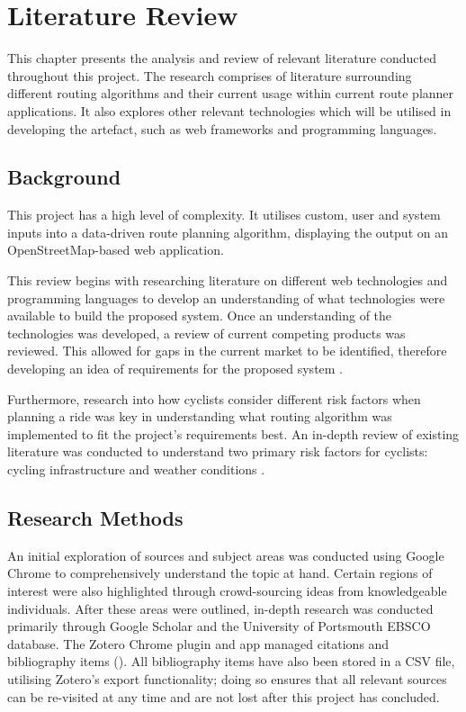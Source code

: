 \chapter{Literature Review} 
\label{chap:litrev}

This chapter presents the analysis and review of relevant literature conducted throughout this project. The research comprises of literature surrounding different routing algorithms and their current usage within current route planner applications. It also explores other relevant technologies which will be utilised in developing the artefact, such as web frameworks and programming languages.

\section{Background}
\label{litrev:background}
This project has a high level of complexity. It utilises custom, user and system inputs into a data-driven route planning algorithm, displaying the output on an OpenStreetMap-based web application. 

This review begins with researching literature on different web technologies and programming languages to develop an understanding of what technologies were available to build the proposed system. Once an understanding of the technologies was developed, a review of current competing products was reviewed. This allowed for gaps in the current market to be identified, therefore developing an idea of requirements for the proposed system . 

Furthermore, research into how cyclists consider different risk factors when planning a ride was key in understanding what routing algorithm was implemented to fit the project's requirements best. An in-depth review of existing literature was conducted to understand two primary risk factors for cyclists: cycling infrastructure  and weather conditions . 

\section{Research Methods}
\label{litrev:researchmethod}

An initial exploration of sources and subject areas was conducted using Google Chrome to comprehensively understand the topic at hand. Certain regions of interest were also highlighted through crowd-sourcing ideas from knowledgeable individuals. After these areas were outlined, in-depth research was conducted primarily through Google Scholar and the University of Portsmouth EBSCO database. The Zotero Chrome plugin and app managed citations and bibliography items (\cite{noauthor_zotero_nodate}). All bibliography items have also been stored in a CSV file, utilising Zotero's export functionality; doing so ensures that all relevant sources can be re-visited at any time and are not lost after this project has concluded.

